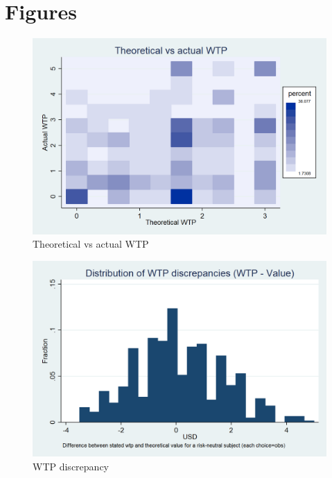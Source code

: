 \documentclass[12pt,a4paper]{article}
\begin{document}


 \label{het_wtp_tab}




\newpage
\section{Figures}


\begin{figure}[H]
\centering
\caption{Theoretical vs actual WTP}\label{wtp_heat_fig}
\includegraphics[scale=0.3]{Graphs/WTP_value_heat.png}
\end{figure}

\begin{figure}[H]
\centering
\caption{WTP discrepancy} \label{WTP_discrepancy_fig}

  \centering
  \includegraphics[scale=0.3]{Graphs/hist_WTP_discr1.png}

\end{figure}
\end{document}
